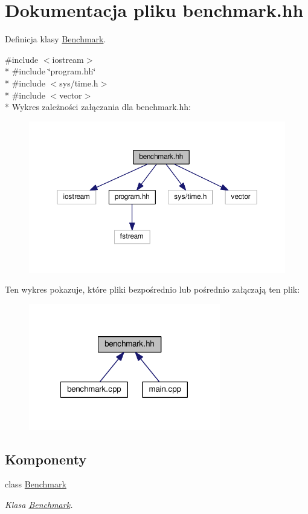 \hypertarget{benchmark_8hh}{\section{Dokumentacja pliku benchmark.\-hh}
\label{benchmark_8hh}
}


Definicja klasy \hyperlink{class_benchmark}{Benchmark}.  


{\ttfamily \#include $<$iostream$>$}\\*
{\ttfamily \#include \char`\"{}program.\-hh\char`\"{}}\\*
{\ttfamily \#include $<$sys/time.\-h$>$}\\*
{\ttfamily \#include $<$vector$>$}\\*
Wykres zależności załączania dla benchmark.\-hh\-:
\nopagebreak
\begin{figure}[H]
\begin{center}
\leavevmode
\includegraphics[width=350pt]{benchmark_8hh__incl}
\end{center}
\end{figure}
Ten wykres pokazuje, które pliki bezpośrednio lub pośrednio załączają ten plik\-:
\nopagebreak
\begin{figure}[H]
\begin{center}
\leavevmode
\includegraphics[width=237pt]{benchmark_8hh__dep__incl}
\end{center}
\end{figure}
\subsection*{Komponenty}
\begin{DoxyCompactItemize}
\item 
class \hyperlink{class_benchmark}{Benchmark}
\begin{DoxyCompactList}\small\item\em Klasa \hyperlink{class_benchmark}{Benchmark}. \end{DoxyCompactList}\end{DoxyCompactItemize}
